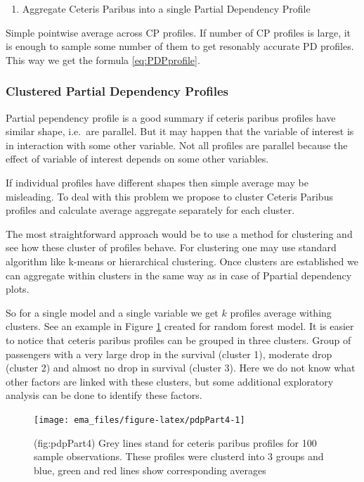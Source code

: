 \documentclass[12pt,]{krantz}
\providecommand{\tightlist}{%
  \setlength{\itemsep}{0pt}\setlength{\parskip}{0pt}}
\begin{document}
\begin{enumerate}
\def\labelenumi{\arabic{enumi}.}
\setcounter{enumi}{1}
\tightlist
\item
  Aggregate Ceteris Paribus into a single Partial Dependency Profile
\end{enumerate}

Simple pointwise average across CP profiles. If number of CP profiles is large, it is enough to sample some number of them to get resonably accurate PD profiles.
This way we get the formula \eqref{eq:PDPprofile}.

\hypertarget{clustered-partial-dependency-profiles}{%
\subsubsection{Clustered Partial Dependency Profiles}\label{clustered-partial-dependency-profiles}}

Partial pependency profile is a good summary if ceteris paribus profiles have similar shape, i.e.~are parallel. But it may happen that the variable of interest is in interaction with some other variable. Not all profiles are parallel because the effect of variable of interest depends on some other variables.

If individual profiles have different shapes then simple average may be misleading.
To deal with this problem we propose to cluster Ceteris Paribus profiles and calculate average aggregate separately for each cluster.

The most straightforward approach would be to use a method for clustering and see how these cluster of profiles behave.
For clustering one may use standard algorithm like k-means or hierarchical clustering. Once clusters are established we can aggregate within clusters in the same way as in case of Ppartial dependency plots.

So for a single model and a single variable we get \(k\) profiles average withing clusters.
See an example in Figure \ref{fig:pdpPart4} created for random forest model. It is easier to notice that ceteris paribus profiles can be grouped in three clusters. Group of passengers with a very large drop in the survival (cluster 1), moderate drop (cluster 2) and almost no drop in survival (cluster 3). Here we do not know what other factors are linked with these clusters, but some additional exploratory analysis can be done to identify these factors.

\begin{figure}

{\centering \texttt{[image: ema\_files/figure-latex/pdpPart4-1]} 

}

\caption{(fig:pdpPart4) Grey lines stand for ceteris paribus profiles for 100 sample observations. These profiles were clusterd into 3 groups and blue, green and red lines show corresponding averages}\label{fig:pdpPart4}
\end{figure}
\end{document}
